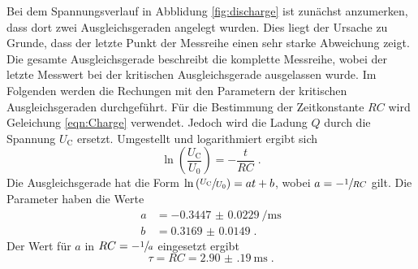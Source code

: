 \noindent Bei dem Spannungsverlauf in Abblidung \ref{fig:discharge} ist zunächst anzumerken, dass dort zwei Ausgleichsgeraden angelegt wurden. 
Dies liegt der Ursache zu Grunde, dass der letzte Punkt der Messreihe einen sehr starke Abweichung zeigt.
Die gesamte Ausgleichsgerade beschreibt die komplette Messreihe, wobei der letzte Messwert bei der kritischen Ausgleichsgerade ausgelassen wurde.
Im Folgenden werden die Rechungen mit den Parametern der kritischen Ausgleichsgeraden durchgeführt.
Für die Bestimmung der Zeitkonstante $RC$ wird Geleichung \eqref{eqn:Charge} verwendet.
Jedoch wird die Ladung $Q$ durch die Spannung $U_\text{C}$ ersetzt.
Umgestellt und logarithmiert ergibt sich 
\begin{equation}
    \ln \left( \frac{U_\text{C}}{U_0} \right ) =  - \frac{t}{RC} \; \text{.} 
\end{equation} 
Die Ausgleichsgerade hat die Form $ \ln \left( \sfrac{U_\text{C}}{U_0} \right ) = at + b$, wobei $a = - \sfrac{1}{RC}$ gilt.
Die Parameter haben die Werte 
\begin{align*}
    a &= \SI{-0.3447(229)}{\per\milli\second} \\
    b &= \num{0.3169(149)} \; \text{.}
\end{align*}
Der Wert für $a$ in $RC = - \sfrac{1}{a}$ eingesetzt ergibt
\begin{equation*}
    \tau = RC = \SI{2.90(19)}{\milli\second} \; \text{.}
\end{equation*}
